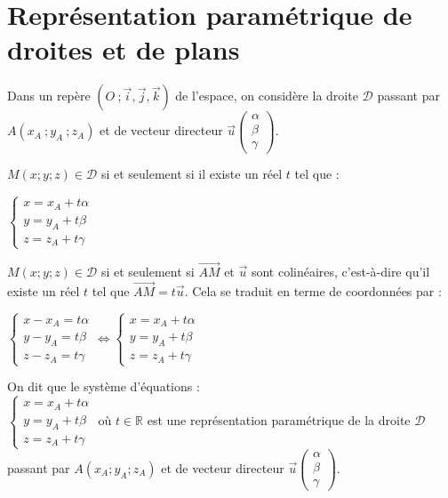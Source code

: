 \documentclass{cornouaille}
\begin{document}
\section{Représentation paramétrique de droites et de plans}

\begin{propriete}
  Dans un repère $(O\ ;\vec{i},\vec{j},\vec{k})$ de l'espace, on
  considère la droite $\mathcal{D}$ passant par $A(x_A\ ;y_A\ ;z_A)$
  et de vecteur directeur
  $\vec{u} \begin {pmatrix} \alpha\\\beta\\\gamma \end{pmatrix}$.

  $M(x;y;z)\in \mathcal{D}$ si et seulement si il existe un réel $t$
  tel que :
  \begin{center}
    $\begin{cases}x=x_A+t\alpha \\y=y_A+t\beta
      \\z=z_A+t\gamma \end{cases}$
  \end{center}
\end{propriete}

\begin{preuve}
  $M(x;y;z)\in \mathcal{D}$ si et seulement si $\overrightarrow{AM}$
  et $\vec{u}$ sont colinéaires, c'est-à-dire qu'il existe un réel $t$
  tel que $\overrightarrow{AM}=t\overrightarrow{u}$.  Cela se traduit
  en terme de coordonnées par :

  $\begin{cases}x-x_A=t\alpha \\y-y_A=t\beta
    \\z-z_A=t\gamma \end{cases}\Leftrightarrow\begin{cases}x=x_A+t\alpha
    \\y=y_A+t\beta \\z=z_A+t\gamma \end{cases}$
\end{preuve}

\begin{definition}
  On dit que le système d'équations : \\
  $\begin{cases}
    x=x_A+t\alpha    \\
    y=y_A+t\beta \\
    z=z_A+t\gamma 
  \end{cases}$
  où $t\in\mathbb{R}$ est une représentation
    paramétrique de la droite $\mathcal{D}$ passant par
  $A(x_A;y_A;z_A)$ et de vecteur directeur $\vec{u}
  \begin {pmatrix} 
    \alpha\\
    \beta\\
    \gamma 
  \end{pmatrix}$.
\end{definition}
\end{document}
